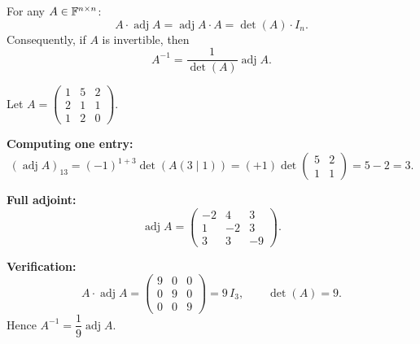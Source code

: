 \begin{propbox}
\label{prop:adjoint-inverse}
For any $A\in\mathbb{F}^{n\times n}$:
\[
    A\cdot\operatorname{adj}A
    = \operatorname{adj}A\cdot A
    = \det(A)\cdot I_n.
\]
Consequently, if $A$ is invertible, then
\[
    A^{-1} = \frac{1}{\det(A)}\operatorname{adj}A.
\]
\end{propbox}

\begin{exbox}
\label{ex:adjoint}
Let $A=\begin{pmatrix}1&5&2\\2&1&1\\1&2&0\end{pmatrix}$.

\medskip\noindent
\textbf{Computing one entry:}
\[
    (\operatorname{adj}A)_{13}
    = (-1)^{1+3}\det(A(3\mid 1))
    = (+1)\det\!\begin{pmatrix}5&2\\1&1\end{pmatrix}
    = 5-2 = 3.
\]

\medskip\noindent
\textbf{Full adjoint:}
\[
    \operatorname{adj}A =
    \begin{pmatrix}-2&4&3\\1&-2&3\\3&3&-9\end{pmatrix}.
\]

\medskip\noindent
\textbf{Verification:}
\[
    A\cdot\operatorname{adj}A
    = \begin{pmatrix}9&0&0\\0&9&0\\0&0&9\end{pmatrix}
    = 9\,I_3, \qquad \det(A)=9.
\]
Hence $A^{-1} = \dfrac{1}{9}\operatorname{adj}A$.
\end{exbox}
